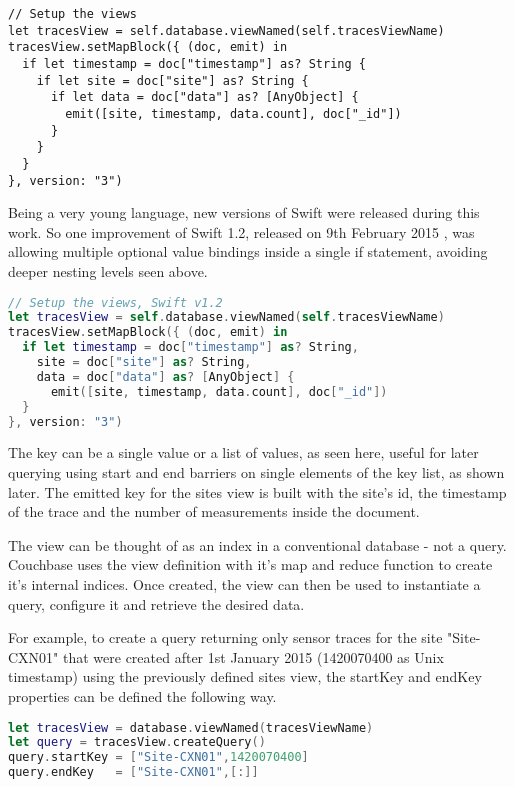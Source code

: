 \begin{lstlisting}[basicstyle=\footnotesize,caption=The map function of the traces view]
// Setup the views
let tracesView = self.database.viewNamed(self.tracesViewName)
tracesView.setMapBlock({ (doc, emit) in
  if let timestamp = doc["timestamp"] as? String {
    if let site = doc["site"] as? String {
      if let data = doc["data"] as? [AnyObject] {
        emit([site, timestamp, data.count], doc["_id"])
      }
    }
  }
}, version: "3")
\end{lstlisting}

Being a very young language, new versions of Swift were released during this work. So one improvement of Swift 1.2, released on 9th February 2015 \cite{swift-1-2}, was allowing multiple optional value bindings inside a single if statement, avoiding deeper nesting levels seen above. 

\begin{lstlisting}[basicstyle=\footnotesize,caption=The map function avoiding nesting with Swift 1.2,language=Swift]
// Setup the views, Swift v1.2
let tracesView = self.database.viewNamed(self.tracesViewName)
tracesView.setMapBlock({ (doc, emit) in
  if let timestamp = doc["timestamp"] as? String, 
    site = doc["site"] as? String, 
    data = doc["data"] as? [AnyObject] {
      emit([site, timestamp, data.count], doc["_id"])
  }
}, version: "3")
\end{lstlisting}

The key can be a single value or a list of values, as seen here, useful for later querying using start and end barriers on single elements of the key list, as shown later. The emitted key for the sites view is built with the site's id, the timestamp of the trace and the number of measurements inside the document. 

The view can be thought of as an index in a conventional database - not a query. Couchbase uses the view definition with it's map and reduce function to create it's internal indices. Once created, the view can then be used to instantiate a query, configure it and retrieve the desired data.

For example, to create a query returning only sensor traces for the site "Site-CXN01" that were created after 1st January 2015 (1420070400 as Unix timestamp) using the previously defined sites view, the startKey and endKey properties can be defined the following way.

\begin{lstlisting}[basicstyle=\footnotesize,caption=Setting up the NoSQL query,language=Swift,label=lst:nosql-query]
let tracesView = database.viewNamed(tracesViewName)
let query = tracesView.createQuery()
query.startKey = ["Site-CXN01",1420070400]
query.endKey   = ["Site-CXN01",[:]]
\end{lstlisting}       


